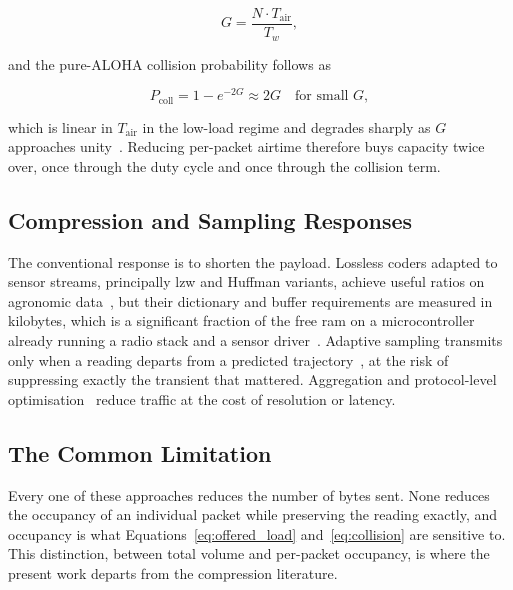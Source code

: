 \documentclass[12pt,a4paper,oneside]{book}
\begin{document}
\begin{equation}
  G = \frac{N \cdot T_{\text{air}}}{T_w},
  \label{eq:offered_load}
\end{equation}

and the pure-ALOHA collision probability follows as

\begin{equation}
  P_{\text{coll}} = 1 - e^{-2G} \approx 2G \quad \text{for small } G,
  \label{eq:collision}
\end{equation}

which is linear in $T_{\text{air}}$ in the low-load regime and degrades sharply
as $G$ approaches unity~\cite{bor2016lorawan, adelantado2017understanding}.
Reducing per-packet airtime therefore buys capacity twice over, once through
the duty cycle and once through the collision term.

\subsection{Compression and Sampling Responses}

The conventional response is to shorten the payload. Lossless coders adapted to
sensor streams, principally \gls{lzw} and Huffman variants, achieve useful
ratios on agronomic data~\cite{li2018lossless, marcelloni2009energy}, but their
dictionary and buffer requirements are measured in kilobytes, which is a
significant fraction of the free \gls{ram} on a microcontroller already running
a radio stack and a sensor driver~\cite{chen2025compression}. Adaptive sampling
transmits only when a reading departs from a predicted
trajectory~\cite{kjellsson2008adaptive}, at the risk of suppressing exactly the
transient that mattered. Aggregation and protocol-level
optimisation~\cite{heinzelman2000energy, sanchez2021energy} reduce traffic at
the cost of resolution or latency.

\subsection{The Common Limitation}

Every one of these approaches reduces the number of bytes sent. None reduces
the occupancy of an individual packet while preserving the reading exactly, and
occupancy is what Equations~\ref{eq:offered_load} and~\ref{eq:collision} are
sensitive to. This distinction, between total volume and per-packet occupancy,
is where the present work departs from the compression literature.
\end{document}
